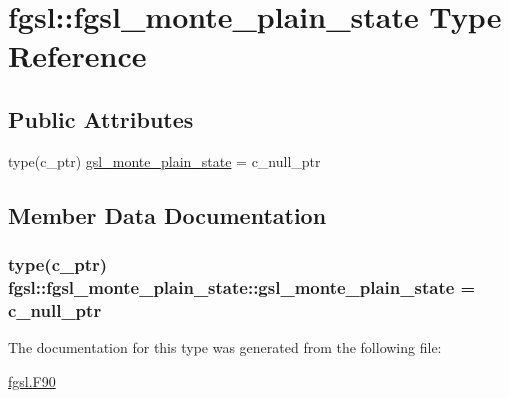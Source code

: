 \hypertarget{structfgsl_1_1fgsl__monte__plain__state}{}\section{fgsl\+:\+:fgsl\+\_\+monte\+\_\+plain\+\_\+state Type Reference}
\label{structfgsl_1_1fgsl__monte__plain__state}
\subsection*{Public Attributes}
\begin{DoxyCompactItemize}
\item 
type(c\+\_\+ptr) \hyperlink{structfgsl_1_1fgsl__monte__plain__state_a1917f5fa5cb7b26af000d85f01ae44cb}{gsl\+\_\+monte\+\_\+plain\+\_\+state} = c\+\_\+null\+\_\+ptr
\end{DoxyCompactItemize}


\subsection{Member Data Documentation}
\hypertarget{structfgsl_1_1fgsl__monte__plain__state_a1917f5fa5cb7b26af000d85f01ae44cb}{}
\subsubsection[{gsl\+\_\+monte\+\_\+plain\+\_\+state}]{\setlength{\rightskip}{0pt plus 5cm}type(c\+\_\+ptr) fgsl\+::fgsl\+\_\+monte\+\_\+plain\+\_\+state\+::gsl\+\_\+monte\+\_\+plain\+\_\+state = c\+\_\+null\+\_\+ptr}\label{structfgsl_1_1fgsl__monte__plain__state_a1917f5fa5cb7b26af000d85f01ae44cb}


The documentation for this type was generated from the following file\+:\begin{DoxyCompactItemize}
\item 
\hyperlink{fgsl_8F90}{fgsl.\+F90}\end{DoxyCompactItemize}
